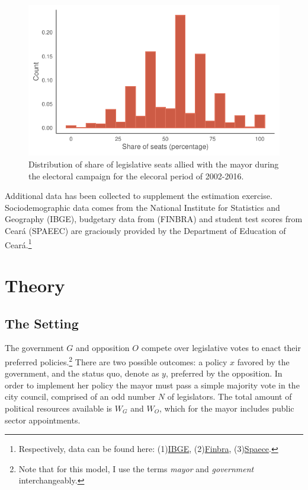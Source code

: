 \documentclass[12pt,a4paper]{article}
\begin{document}
\begin{figure}
    \centering
    \includegraphics[width=0.6\linewidth]{plots/hist_coalition.pdf}
    \caption{Distribution of share of legislative seats allied with the mayor during the electoral campaign for the elecoral period of 2002-2016.}
    \label{fig:hist_coalition}
\end{figure}

Additional data has been collected to supplement the estimation exercise. Sociodemographic data comes from the National Institute for Statistics and Geography (IBGE), budgetary data from (FINBRA) and student test scores from Ceará (SPAEEC) are graciously provided by the Department of Education of Ceará.\footnote{Respectively, data can be found here: (1)\hyperlink{https://ces.ibge.gov.br/base-de-dados/links-base-de-dados.html}{IBGE}, (2)\hyperlink{https://siconfi.tesouro.gov.br/siconfi/pages/public/consulta_finbra/finbra_list.jsf}{Finbra}, (3)\hyperlink{https://www.seduc.ce.gov.br/spaece/}{Spaece}.}

\section{Theory}
\label{sec:theory}

\subsection*{The Setting}

The government $G$ and opposition $O$ compete over legislative votes to enact their preferred policies.\footnote{Note that for this model, I use the terms \emph{mayor} and \emph{government} interchangeably.} There are two possible outcomes: a policy $x$ favored by the government, and the status quo, denote as $y$, preferred by the opposition. In order to implement her policy the mayor must pass a simple majority vote in the city council, comprised of an odd number $N$ of legislators. The total amount of political resources available is $W_G$ and $W_O$, which for the mayor includes public sector appointments.
\end{document}

